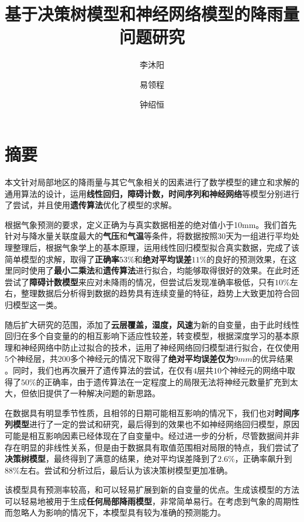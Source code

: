 \documentclass[UTF8, a4paper]{ctexart}
\title{基于决策树模型和神经网络模型的降雨量问题研究}
\author{李沐阳 \and 易领程 \and 钟绍恒}
\begin{document}
\maketitle

\newpage

\tableofcontents


\newpage

\section{摘要}

本文针对局部地区的降雨量与其它气象相关的因素进行了数学模型的建立和求解的通用算法的设计，运用\textbf{线性回归，障碍计数，时间序列和神经网络}等模型分别进行了尝试，并且使用\textbf{遗传算法}优化了模型的求解。

根据气象预测的要求，定义正确为与真实数据相差的绝对值小于10mm。我们首先针对与降水量关联度最大的\textbf{气压}和\textbf{气温}等条件，将数据按照$30$天为一组进行平均处理整理后，根据气象学上的基本原理，运用线性回归模型拟合真实数据，完成了该简单模型的求解，取得了\textbf{正确率$53 \%$}和\textbf{绝对平均误差$11\%$}的良好的预测效果，在这里同时使用了\textbf{最小二乘法}和\textbf{遗传算法}进行拟合，均能够取得很好的效果。在此时还尝试了\textbf{障碍计数模型}来应对未降雨的情况，但尝试后发现准确率极低，只有$10\%$左右，整理数据后分析得到数据的趋势具有连续变量的特征，趋势上大致更加符合回归模型这一类。

随后扩大研究的范围，添加了\textbf{云层覆盖，湿度，风速}为新的自变量，由于此时线性回归在多个自变量的的相互影响下适应性较差，转变模型，根据深度学习的基本原理和神经网络中防止过拟合的技术，运用了神经网络回归模型进行拟合，在仅使用$5$个神经层，共$200$多个神经元的情况下取得了\textbf{绝对平均误差仅为$9mm$}的优异结果 。同时，我们也再次展开了遗传算法的尝试，在仅有$4$层共$10$个神经元的网络中取得了$50\%$的正确率，由于遗传算法在一定程度上的局限无法将神经元数量扩充到太大，但依旧提供了一种解决问题的新思路。

在数据具有明显季节性质，且相邻的日期可能相互影响的情况下，我们也对\textbf{时间序列模型}进行了一定的尝试和研究，最后得到的效果也不如神经网络回归模型，原因可能是相互影响因素已经体现在了自变量中。经过进一步的分析，尽管数据间并非存在明显的非线性关系，但是由于数据具有取值范围相对局限的特点，我们尝试了\textbf{决策树模型}，最终得到了满意的结果，绝对平均误差降到了$2.6\%$，正确率飙升到$88\%$左右。尝试和分析过后，最后认为该决策树模型更加准确。

该模型具有预测率较高，和可以轻易扩展到新的自变量的优点。生成该模型的方法可以轻易地被用于生成\textbf{任何局部降雨模型}，非常简单易行。在考虑到气象的周期性而忽略人为影响的情况下，本模型具有较为准确的预测能力。
\end{document}
